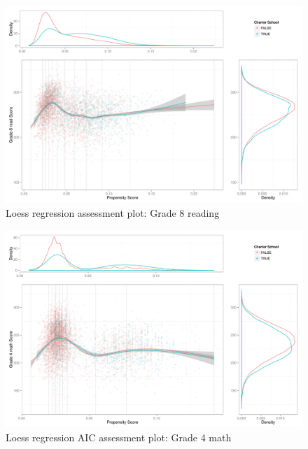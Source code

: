\begin{figure}[h!]
\begin{center}
\includegraphics[height=.4\textheight]{../Figures2009/g8read-loess.pdf}
\caption{Loess regression assessment plot: Grade 8 reading}
\label{fig:g8read:loess}
\end{center}
\end{figure}

\begin{figure}[h!]
\begin{center}
\includegraphics[height=.4\textheight]{../Figures2009/g4math-loessAIC.pdf}
\caption{Loess regression AIC assessment plot: Grade 4 math}
\label{fig:g4math:loessAIC}
\end{center}
\end{figure}

